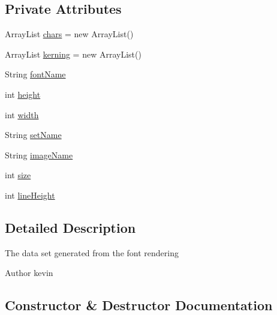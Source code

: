 \subsection*{Private Attributes}
\begin{DoxyCompactItemize}
\item 
Array\+List \mbox{\hyperlink{classorg_1_1newdawn_1_1slick_1_1tools_1_1hiero_1_1_data_set_a6623d34b60d062494838b664632c15a6}{chars}} = new Array\+List()
\item 
Array\+List \mbox{\hyperlink{classorg_1_1newdawn_1_1slick_1_1tools_1_1hiero_1_1_data_set_a6a34bd71965bd3b2e169755305389ab8}{kerning}} = new Array\+List()
\item 
String \mbox{\hyperlink{classorg_1_1newdawn_1_1slick_1_1tools_1_1hiero_1_1_data_set_ab0f4c67d67a65d79f10572e7ce459769}{font\+Name}}
\item 
int \mbox{\hyperlink{classorg_1_1newdawn_1_1slick_1_1tools_1_1hiero_1_1_data_set_a4e81f554bbcc0c83a03123c0d84256c6}{height}}
\item 
int \mbox{\hyperlink{classorg_1_1newdawn_1_1slick_1_1tools_1_1hiero_1_1_data_set_afbd3cb40d79ad92dd8c605d1a6a9e420}{width}}
\item 
String \mbox{\hyperlink{classorg_1_1newdawn_1_1slick_1_1tools_1_1hiero_1_1_data_set_aa99e808e25a854b36feda6b64cb08bc9}{set\+Name}}
\item 
String \mbox{\hyperlink{classorg_1_1newdawn_1_1slick_1_1tools_1_1hiero_1_1_data_set_afc8adad2798f5bec23a83211af00241c}{image\+Name}}
\item 
int \mbox{\hyperlink{classorg_1_1newdawn_1_1slick_1_1tools_1_1hiero_1_1_data_set_ac4d3e35615d65f0ed46ff2cea9dcc895}{size}}
\item 
int \mbox{\hyperlink{classorg_1_1newdawn_1_1slick_1_1tools_1_1hiero_1_1_data_set_adfaf42d468a6c97ab5e478c89db021d7}{line\+Height}}
\end{DoxyCompactItemize}


\subsection{Detailed Description}
The data set generated from the font rendering

\begin{DoxyAuthor}{Author}
kevin 
\end{DoxyAuthor}


\subsection{Constructor \& Destructor Documentation}
\mbox{\label{classorg_1_1newdawn_1_1slick_1_1tools_1_1hiero_1_1_data_set_a0b1f344c50413ba77ff7eda8ba1937d5}} 
